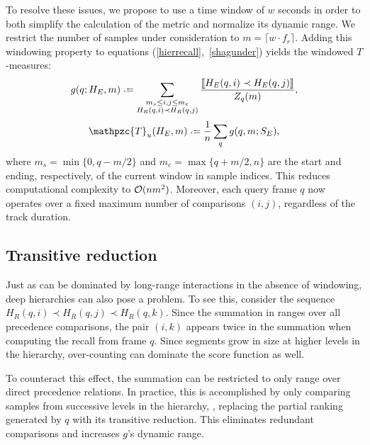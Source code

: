\documentclass{article}
\def\shag{\ensuremath{\mathpzc{T}}}
\begin{document}
To resolve these issues, we propose to use a time window of $w$ seconds in order to both simplify the 
calculation of the metric and normalize its dynamic range.
We restrict the number of samples under consideration to $m = \lceil w \cdot f_r \rceil$.
Adding this windowing property to equations (\ref{hierrecall},~\ref{shagunder}) yields the windowed $T$-measures:
\begin{equation}
  g(q ; H_E, m) \defeq \sum_{\substack{
  m_s \leq i,j \leq m_e \\ 
  H_R(q, i) \prec H_R(q, j) }} \frac{\ind{H_E(q, i) \prec H_E(q,
  j)}}{Z_q(m)},\label{windowrecall}
\end{equation}
\begin{equation}
\shag_u(H_E, m) \defeq \frac{1}{n} \sum_q g(q,m ; S_E),
\end{equation}
where $m_s = \min\{0,q-m/2\}$ and $m_e = \max\{q+m/2,n\}$ are the start and ending, respectively, of the current window in sample indices.
This reduces computational complexity to $\mathcal{O}(nm^2)$.  Moreover, each query frame $q$ now operates over a
fixed maximum number of comparisons $(i, j)$, regardless of the track duration.


\subsection{Transitive reduction}

Just as  can be dominated by long-range interactions in the absence of windowing, deep hierarchies can also pose a problem.
To see this, consider the sequence $H_R(q, i) \prec H_R(q, j) \prec H_R(q, k)$.
Since the summation in  ranges over all precedence comparisons, the pair $(i, k)$ appears twice in the summation when computing the recall from frame $q$.  
Since segments grow in size at higher levels in the hierarchy, over-counting can dominate the score function as well.

To counteract this effect, the summation can be restricted to only range over direct precedence relations.
In practice, this is accomplished by only comparing samples from successive levels in the hierarchy, \ie, 
replacing the partial ranking generated by $q$ with its transitive reduction.
This eliminates redundant comparisons and increases $g$'s dynamic range.


\end{document}
